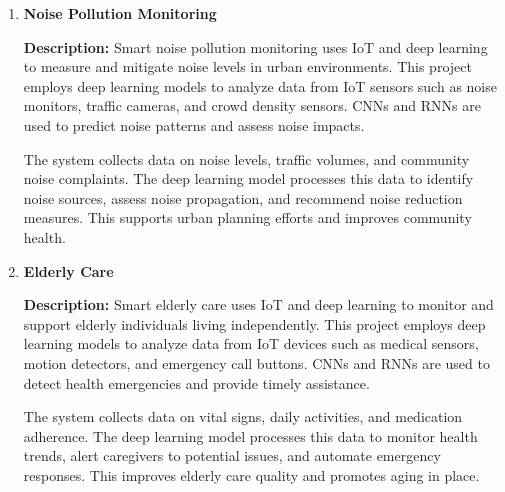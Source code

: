 \documentclass{article}
\begin{document}
\begin{enumerate}[label=\textbf{\arabic*.}, leftmargin=*]

\vspace{24pt} %
\item \textbf{Noise Pollution Monitoring}

\textbf{Description:}
Smart noise pollution monitoring uses IoT and deep learning to measure and mitigate noise levels in urban environments. This project employs deep learning models to analyze data from IoT sensors such as noise monitors, traffic cameras, and crowd density sensors. CNNs and RNNs are used to predict noise patterns and assess noise impacts.

The system collects data on noise levels, traffic volumes, and community noise complaints. The deep learning model processes this data to identify noise sources, assess noise propagation, and recommend noise reduction measures. This supports urban planning efforts and improves community health.



\vspace{24pt} %
\item \textbf{Elderly Care}

\textbf{Description:}
Smart elderly care uses IoT and deep learning to monitor and support elderly individuals living independently. This project employs deep learning models to analyze data from IoT devices such as medical sensors, motion detectors, and emergency call buttons. CNNs and RNNs are used to detect health emergencies and provide timely assistance.

The system collects data on vital signs, daily activities, and medication adherence. The deep learning model processes this data to monitor health trends, alert caregivers to potential issues, and automate emergency responses. This improves elderly care quality and promotes aging in place.




\end{enumerate}
\end{document}
